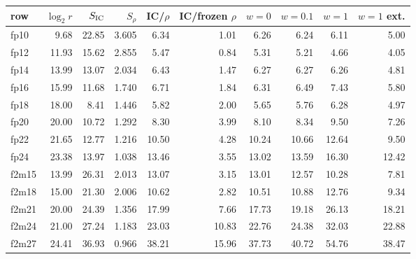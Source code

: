 \begin{tabular}{@{}lrrrrrrrrr@{}}
\toprule
row & $\log_2 r$ & $S_{\rm IC}$ & $S_\rho$ & IC/$\rho$ & IC/frozen $\rho$ & $w=0$ & $w=0.1$ & $w=1$ & $w=1$ ext. \\
\midrule
fp10 & 9.68 & 22.85 & 3.605 & 6.34 & 1.01 & 6.26 & 6.24 & 6.11 & 5.00 \\
fp12 & 11.93 & 15.62 & 2.855 & 5.47 & 0.84 & 5.31 & 5.21 & 4.66 & 4.05 \\
fp14 & 13.99 & 13.07 & 2.034 & 6.43 & 1.47 & 6.27 & 6.27 & 6.26 & 4.81 \\
fp16 & 15.99 & 11.68 & 1.740 & 6.71 & 1.84 & 6.31 & 6.49 & 7.43 & 5.80 \\
fp18 & 18.00 & 8.41 & 1.446 & 5.82 & 2.00 & 5.65 & 5.76 & 6.28 & 4.97 \\
fp20 & 20.00 & 10.72 & 1.292 & 8.30 & 3.99 & 8.10 & 8.34 & 9.50 & 7.26 \\
fp22 & 21.65 & 12.77 & 1.216 & 10.50 & 4.28 & 10.24 & 10.66 & 12.64 & 9.50 \\
fp24 & 23.38 & 13.97 & 1.038 & 13.46 & 3.55 & 13.02 & 13.59 & 16.30 & 12.42 \\
\addlinespace
f2m15 & 13.99 & 26.31 & 2.013 & 13.07 & 3.15 & 13.01 & 12.57 & 10.28 & 7.81 \\
f2m18 & 15.00 & 21.30 & 2.006 & 10.62 & 2.82 & 10.51 & 10.88 & 12.76 & 9.34 \\
f2m21 & 20.00 & 24.39 & 1.356 & 17.99 & 7.66 & 17.73 & 19.18 & 26.13 & 18.21 \\
f2m24 & 21.00 & 27.24 & 1.183 & 23.03 & 10.83 & 22.76 & 24.38 & 32.03 & 22.88 \\
f2m27 & 24.41 & 36.93 & 0.966 & 38.21 & 15.96 & 37.73 & 40.72 & 54.76 & 38.47 \\
\bottomrule
\end{tabular}
